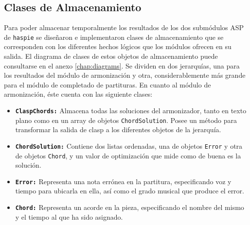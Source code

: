 \subsection{Clases de Almacenamiento}
\label{subsec:store_classes}
Para poder almacenar temporalmente los resultados de los dos submódulos ASP de \texttt{haspie} se diseñaron e implementaron clases de almacenamiento que se corresponden con los diferentes hechos lógicos que los módulos ofrecen en su salida. El diagrama de clases de estos objetos de almacenamiento puede consultarse en el anexo \ref{chap:diagrams}. Se dividen en dos jerarquías, una para los resultados del módulo de armonización y otra, considerablemente más grande para el módulo de completado de partituras. 
En cuanto al módulo de armonización, éste cuenta con las siguiente clases:
\begin{itemize}
	\item \texttt{\textbf{ClaspChords:}} Almacena todas las soluciones del armonizador, tanto en texto plano como en un array de objetos \texttt{ChordSolution}. Posee un método para transformar la salida de clasp a los diferentes objetos de la jerarquía.
	\item \texttt{\textbf{ChordSolution:}} Contiene dos listas ordenadas, una de objetos \texttt{Error} y otra de objetos \texttt{Chord}, y un valor de optimización que mide como de buena es la solución.
	\item \texttt{\textbf{Error:}} Representa una nota errónea en la partitura, especificando voz y tiempo para ubicarla en ella, así como el grado musical que produce el error.
	\item \texttt{\textbf{Chord:}} Representa un acorde en la pieza, especificando el nombre del mismo y el tiempo al que ha sido asignado.
\end{itemize}

